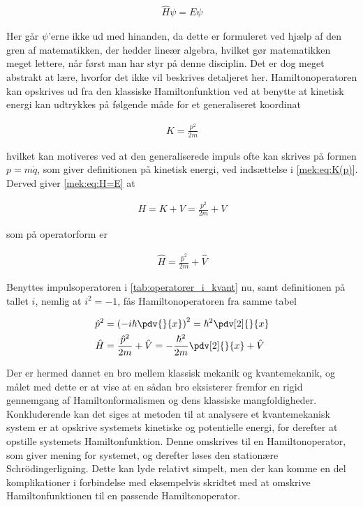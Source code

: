 \begin{align}
	\hat{H}\psi = E\psi
\end{align}

Her går $\psi$'erne ikke ud med hinanden, da dette er formuleret ved hjælp af den gren af matematikken, der hedder lineær algebra, hvilket gør matematikken meget lettere, når først man har styr på denne disciplin. Det er dog meget abstrakt at lære, hvorfor det ikke vil beskrives detaljeret her. Hamiltonoperatoren kan opskrives ud fra den klassiske Hamiltonfunktion ved at benytte at kinetisk energi kan udtrykkes på følgende måde for et generaliseret koordinat

\begin{align} \label{mek:eq:K(p)}
	K =  \frac{p^2}{2m}
\end{align}

hvilket kan motiveres ved at den generaliserede impuls ofte kan skrives på formen $p = m\dot{q}$, som giver definitionen på kinetisk energi, ved indsættelse i \cref{mek:eq:K(p)}. Derved giver \cref{mek:eq:H=E} at

\begin{align}
	H = K + V = \frac{p^2}{2m} + V
\end{align}

som på operatorform er

\begin{align}
	\hat{H} = \frac{\hat{p}^2}{2m} + \hat{V}
\end{align}

Benyttes impulsoperatoren i \cref{tab:operatorer_i_kvant} nu, samt definitionen på tallet $i$, nemlig at $i^2 = -1$, fås Hamiltonoperatoren fra samme tabel

\begin{align}
	\hat{p}^2 &= \left(-i\hbar\pdv{}{x}\right)^2 = \hbar^2\pdv[2]{}{x} \\
	\hat{H} &= \frac{\hat{p}^2}{2m} + \hat{V} = -\frac{\hbar^2}{2m}\pdv[2]{}{x} + \hat{V}
\end{align}

Der er hermed dannet en bro mellem klassisk mekanik og kvantemekanik, og målet med dette er at vise at en sådan bro eksisterer fremfor en rigid gennemgang af Hamiltonformalismen og dens klassiske mangfoldigheder. \\

Konkluderende kan det siges at metoden til at analysere et kvantemekanisk system er at opskrive systemets kinetiske og potentielle energi, for derefter at opstille systemets Hamiltonfunktion. Denne omskrives til en Hamiltonoperator, som giver mening for systemet, og derefter løses den stationære Schrödingerligning. Dette kan lyde relativt simpelt, men der kan komme en del komplikationer i forbindelse med eksempelvis skridtet med at omskrive Hamiltonfunktionen til en passende Hamiltonoperator.